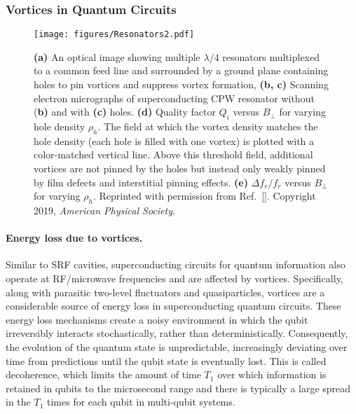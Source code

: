 \documentclass[%
 aip,
 amsmath,amssymb,
 reprint,%
floatfix]{revtex4-1}
\begin{document}
\subsubsection{Vortices in Quantum Circuits\label{ssec:quantumcircuits}}
%
\begin{figure*}
\centering
\texttt{[image: figures/Resonators2.pdf]}
\caption{\label{fig:Resonator}
\textbf{(a)} An optical image showing multiple $\lambda/4$ resonators multiplexed to a common feed line and surrounded by a ground plane containing holes to pin vortices and suppress vortex formation, \textbf{(b, c)} Scanning electron micrographs of superconducting CPW resonator without (\textbf{b)} and with \textbf{(c)} holes. \textbf{(d)} Quality factor $Q_i$ versus $B_{\perp}$ for varying hole density $\rho_h$. The field at which the vortex density matches the hole density (each hole is filled with one vortex) is plotted with a color-matched vertical line.  Above this threshold field, additional vortices are not pinned by the holes but instead only weakly pinned by film defects and interstitial pinning effects. \textbf{(e)} $\Delta f_r/f_r$ versus $B_{\perp}$ for varying $\rho_h$. Reprinted with permission from Ref.~[]. Copyright 2019, \emph{American Physical Society}.
}

\end{figure*}
%

\paragraph{Energy loss due to vortices.} Similar to SRF cavities, superconducting circuits for quantum information also operate at RF/microwave frequencies and are affected by vortices. Specifically, along with parasitic two-level fluctuators and quasiparticles, vortices are a considerable source of energy loss in superconducting quantum circuits\cite{Muller2019, Oliver2013, Martinis2009}. These energy loss mechanisms create a noisy environment in which the qubit irreversibly interacts stochastically, rather than deterministically. Consequently, the evolution of the quantum state is unpredictable, increasingly deviating over time from predictions until the qubit state is eventually lost.  This is called decoherence, which limits the amount of time $T_1$ over which information is retained in qubits to the microsecond range and there is typically a large spread in the $T_1$ times for each qubit in multi-qubit systems\cite{Finke2019}.
\end{document}
